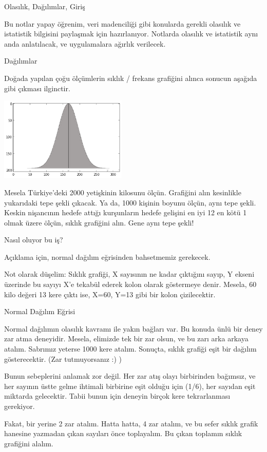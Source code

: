 \documentclass[12pt,fleqn]{article}\usepackage{../../common}
\begin{document}
Olasılık, Dağılımlar, Giriş

Bu notlar yapay öğrenim, veri madenciliği gibi konularda gerekli olasılık
ve istatistik bilgisini paylaşmak için hazırlanıyor. Notlarda olasılık ve
istatistik aynı anda anlatılacak, ve uygulamalara ağırlık verilecek. 

Dağılımlar

Doğada yapılan çoğu ölçümlerin sıklık / frekans grafiğini alınca sonucun
aşağıda gibi çıkması ilginctir.

\includegraphics[height=4cm]{stat_intro_01.png}

Mesela Türkiye'deki 2000 yetişkinin kilosunu ölçün. Grafiğini alın
kesinlikle yukarıdaki tepe şekli çıkacak. Ya da, 1000 kişinin boyunu ölçün,
aynı tepe şekli. Keskin nişancının hedefe attığı kurşunların hedefe
gelişini en iyi 12 en kötü 1 olmak üzere ölçün, sıklık grafiğini alın. Gene
aynı tepe şekli!

Nasıl oluyor bu iş?

Açıklama için, normal dağılım eğrisinden bahsetmemiz gerekecek.

Not olarak düşelim: Sıklık grafiği, X sayısının ne kadar çıktığını sayıp, Y
ekseni üzerinde bu sayıyı X'e tekabül ederek kolon olarak göstermeye
denir. Mesela, 60 kilo değeri 13 kere çıktı ise, X=60, Y=13 gibi bir kolon
çizilecektir.

Normal Dağılım Eğrisi

Normal dağılımın olasılık kavramı ile yakın bağları var. Bu konuda ünlü bir
deney zar atma deneyidir. Mesela, elimizde tek bir zar olsun, ve bu zarı
arka arkaya atalım. Sabrımız yeterse 1000 kere atalım. Sonuçta, sıklık
grafiği eşit bir dağılım gösterecektir. (Zar tutmuyorsanız :) )

Bunun sebeplerini anlamak zor değil. Her zar atış olayı birbirinden
bağımsız, ve her sayının üstte gelme ihtimali birbirine eşit olduğu için
(1/6), her sayıdan eşit miktarda gelecektir. Tabii bunun için deneyin
birçok kere tekrarlanması gerekiyor.

Fakat, bir yerine 2 zar atalım. Hatta hatta, 4 zar atalım, ve bu sefer
sıklık grafik hanesine yazmadan çıkan sayıları önce toplayalım. Bu çıkan
toplamın sıklık grafiğini alalım.
\end{document}
